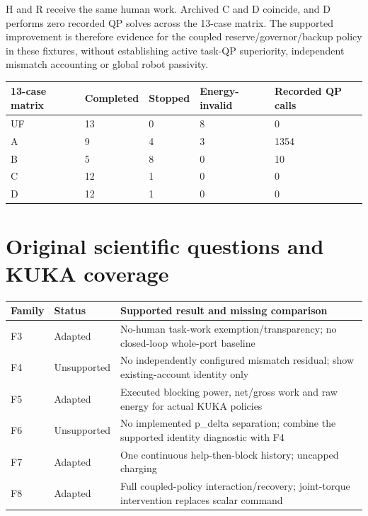 \documentclass[10pt,letterpaper]{article}
\renewcommand{\arraystretch}{1.1}
\begin{document}
H and R receive the same human work. Archived C and D coincide, and D performs zero recorded QP solves across the 13-case matrix. The supported improvement is therefore evidence for the coupled reserve/governor/backup policy in these fixtures, without establishing active task-QP superiority, independent mismatch accounting or global robot passivity.


\begingroup
\small
\setlength{\tabcolsep}{4pt}
\renewcommand{\arraystretch}{1.16}
\begin{tabular}{@{}lllll@{}}
\toprule
\textbf{13-case matrix} & \textbf{Completed} & \textbf{Stopped} & \textbf{Energy-invalid} & \textbf{Recorded QP calls} \\
\midrule
UF & 13 & 0 & 8 & 0 \\
A & 9 & 4 & 3 & 1354 \\
B & 5 & 8 & 0 & 10 \\
C & 12 & 1 & 0 & 0 \\
D & 12 & 1 & 0 & 0 \\
\bottomrule
\end{tabular}
\endgroup


\clearpage
\section*{Original scientific questions and KUKA coverage}
\begingroup
\small
\setlength{\tabcolsep}{4pt}
\renewcommand{\arraystretch}{1.16}
\begin{tabular}{@{}p{}p{}p{}@{}}
\toprule
\textbf{Family} & \textbf{Status} & \textbf{Supported result and missing comparison} \\
\midrule
F3 & Adapted & No-human task-work exemption/transparency; no closed-loop whole-port baseline \\
F4 & Unsupported & No independently configured mismatch residual; show existing-account identity only \\
F5 & Adapted & Executed blocking power, net/gross work and raw energy for actual KUKA policies \\
F6 & Unsupported & No implemented p\_delta separation; combine the supported identity diagnostic with F4 \\
F7 & Adapted & One continuous help-then-block history; uncapped charging \\
F8 & Adapted & Full coupled-policy interaction/recovery; joint-torque intervention replaces scalar command \\
\bottomrule
\end{tabular}
\endgroup
\end{document}
